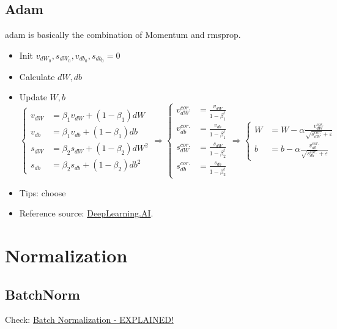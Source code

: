 \subsection{Adam}
\ac{adam} is basically the combination of Momentum and \ac{rmsprop}.
\begin{itemize}
	\item Init $v_{dW_0}, s_{dW_0}, v_{db_0}, s_{db_0}=0$
	\item Calculate $dW, db$
	\item Update $W, b$
	\begin{equation}
		\begin{cases}
			v_{dW} &= \beta_1 v_{dW} + (1-\beta_1)dW \\
			v_{db} &= \beta_1 v_{db} + (1-\beta_1)db \\
			s_{dW} &= \beta_2 s_{dW} + (1-\beta_2)dW^2 \\
			s_{db} &= \beta_2 s_{db} + (1-\beta_2)db^2
		\end{cases}
		\Rightarrow
		\begin{cases}
			v^{cor.}_{dW} &= \frac{v_{dW}}{1 - \beta_1^t} \\
			v^{cor.}_{db} &= \frac{v_{db}}{1 - \beta_1^t} \\
			s^{cor.}_{dW} &= \frac{s_{dW}}{1 - \beta_2^t} \\
			s^{cor.}_{db} &= \frac{s_{db}}{1 - \beta_2^t}
		\end{cases}
		\Rightarrow
		\begin{cases}
			W &= W - \alpha \frac{v^{cor.}_{dW}}{\sqrt{s^{cor.}_{dW}} + \varepsilon}\\
			b &= b - \alpha \frac{v^{cor.}_{db}}{\sqrt{s^{cor.}_{db}} + \varepsilon}
		\end{cases}
	\end{equation}
	\item Tips: choose 
	\item Reference source: \href{https://youtu.be/JXQT_vxqwIs}{DeepLearning.AI}.
\end{itemize}

\section{Normalization}
\subsection{BatchNorm}
Check: \href{https://youtu.be/DtEq44FTPM4}{Batch Normalization - EXPLAINED!}

